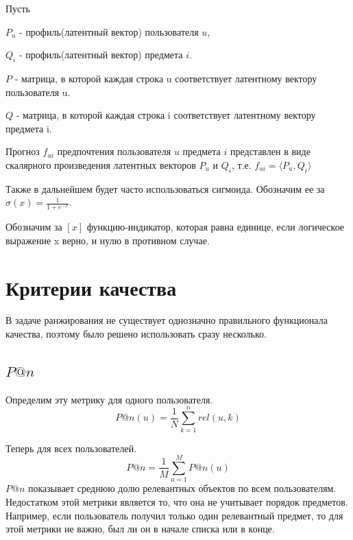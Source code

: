 \documentclass[14pt]{extarticle}
\begin{document}
Пусть  

$P_u$ - профиль(латентный вектор) пользователя $u$,

$Q_i$ - профиль(латентный вектор) предмета $i$.

$P$ - матрица, в которой каждая строка u соответствует латентному вектору пользователя u. 

$Q$ - матрица, в которой каждая строка i соответствует латентному вектору предмета i. 

Прогноз $f_{ui}$ предпочтения пользователя $u$ предмета $i$  представлен в виде скалярного произведения латентных векторов $P_u$ и $Q_i$, т.е. $f_{ui} = \langle P_u, Q_i \rangle$

Также в дальнейшем будет часто использоваться сигмоида. Обозначим ее за $\sigma(x) = \frac{1}{1 + e^{-
x}}$. 

Обозначим за 
$[x]$ функцию-индикатор, которая равна единице, если логическое выражение x верно, и нулю в противном случае.
%

\section{Критерии качества}
В задаче ранжирования не существует однозначно правильного функционала качества, поэтому было решено использовать сразу несколько.

\subsection{$P@n$}
	Определим эту метрику для одного пользователя.
	\begin{equation*}
		P@n(u) = \frac{1}{N}\sum_{k = 1}^n rel(u, k)
	\end{equation*}
	
	Теперь для всех пользователей.
	\begin{equation*}
		P@n = \frac{1}{M}\sum_{u = 1}^M P@n(u)
	\end{equation*}
	$P@n$ показывает среднюю долю релевантных объектов по всем пользователям.  Недостатком этой метрики является то, что она не учитывает порядок предметов. Например,  если пользователь получил только один релевантный предмет, то для этой метрики не важно, был ли он в начале списка или в конце. 
\end{document}
